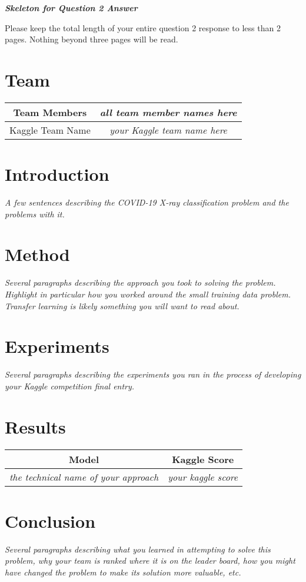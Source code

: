 \documentclass{article}
\begin{document}
\newpage

{\em \bf Skeleton for Question 2 Answer}
\setcounter{section}{0}

Please keep the total length of your entire question 2 response to less than 2 pages.  Nothing beyond three pages will be read. 
\section{Team}
\begin{tabular}{|c | c } 
\hline
Team Members & \emph{all team member names here} \\
\hline
Kaggle Team Name & \emph{your Kaggle team name here}\\
\hline
\end{tabular}
\section{Introduction}
\emph{A few sentences describing the COVID-19 X-ray classification problem and the problems with it.}
\section{Method}
\emph{Several paragraphs describing the approach you took to solving the problem.  Highlight in particular how you worked around the small training
data problem.  Transfer learning is likely something you will want to read
about.}
\section{Experiments}
\emph{Several paragraphs describing the experiments you ran in the process of developing your Kaggle competition final entry.}
\section{Results}

\begin{center}
 \begin{tabular}{|c | c |} 
 \hline
 Model & Kaggle Score  \\ [0.5ex]
 \hline\hline
 \emph{the technical name of your approach} & \emph{your kaggle score} \\
 \hline
\end{tabular}
\end{center}

\section{Conclusion}
\emph{Several paragraphs describing what you learned in attempting to solve this problem, why your team is ranked where it is on the leader board, how you might have changed the problem to make its solution more valuable, etc.}
\newpage
\end{document}
